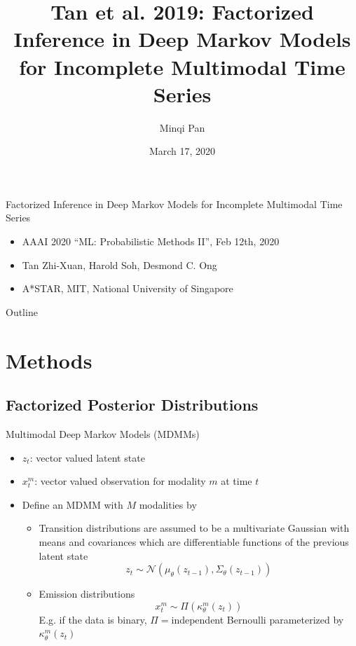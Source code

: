 \documentclass{beamer}
\title[Tan et al. 2019: Factorized Inference in DMM for IMTS]{Tan et al. 2019: Factorized Inference in Deep Markov Models for Incomplete Multimodal Time Series}
\author{Minqi Pan}
\date{March 17, 2020}
\begin{document}
\begin{frame}
  \titlepage
\end{frame}

\begin{frame}{Factorized Inference in Deep Markov Models for Incomplete Multimodal Time Series}
\begin{itemize}
\item AAAI 2020 ``ML: Probabilistic Methods II'', Feb 12th, 2020
\item Tan Zhi-Xuan, Harold Soh, Desmond C. Ong
\item A*STAR, MIT, National University of Singapore
\end{itemize}
\end{frame}

\begin{frame}{Outline}
  \tableofcontents
\end{frame}

\section{Methods}
\subsection{Factorized Posterior Distributions}
\begin{frame}{Multimodal Deep Markov Models (MDMMs)}
\begin{itemize}
\item $z_t$: vector valued latent state
\item $x_t^m$: vector valued observation for modality $m$ at time $t$
\item Define an MDMM with $M$ modalities by
\begin{itemize}
\item Transition distributions are assumed to be a multivariate Gaussian with means and covariances which are differentiable functions of the previous latent state\[
z_t\sim\mathcal{N}(\mu_\theta(z_{t-1}),\Sigma_\theta(z_{t-1}))
\]
\item Emission distributions\[
x_t^m\sim\Pi(\kappa_\theta^m(z_t))
\]E.g. if the data is binary, $\Pi=$independent Bernoulli parameterized by $\kappa_\theta^m(z_t)$
\end{itemize}
\end{itemize}
\end{frame}
\end{document}
